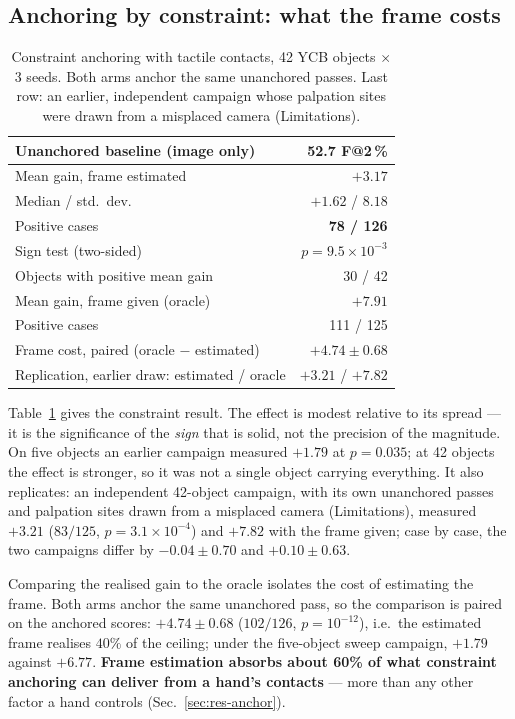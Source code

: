 \documentclass[conference]{IEEEtran}
\makeatletter
\newcommand{\gd}[1]{\textbf{#1}}
\newcommand{\Fs}{F@2\,\%}
\makeatother
\begin{document}
\subsection{Anchoring by constraint: what the frame costs}
\label{sec:res-constraint}

\begin{table}[t]
\centering
\caption{Constraint anchoring with tactile contacts, 42 YCB objects $\times$ 3 seeds.
Both arms anchor the same unanchored passes. Last row: an earlier, independent
campaign whose palpation sites were drawn from a misplaced camera (Limitations).}
\label{tab:main}
\begin{tabular}{lr}
\toprule
Unanchored baseline (image only) & 52.7 \Fs \\
\midrule
Mean gain, frame estimated & \gd{$+3.17$} \\
Median / std.\ dev. & $+1.62$ / $8.18$ \\
Positive cases & \gd{78 / 126} \\
Sign test (two-sided) & \gd{$p = 9.5\times10^{-3}$} \\
Objects with positive mean gain & 30 / 42 \\
\midrule
Mean gain, frame given (oracle) & $+7.91$ \\
Positive cases & 111 / 125 \\
Frame cost, paired (oracle $-$ estimated) & $+4.74 \pm 0.68$ \\
\midrule
Replication, earlier draw: estimated / oracle & $+3.21$ / $+7.82$ \\
\bottomrule
\end{tabular}
\end{table}

Table~\ref{tab:main} gives the constraint result. The effect is modest relative to its
spread --- it is the significance of the \emph{sign} that is solid, not the precision
of the magnitude. On five objects an earlier campaign measured $+1.79$ at $p = 0.035$;
at 42 objects the effect is stronger, so it was not a single object carrying
everything. It also replicates: an independent 42-object campaign, with its own
unanchored passes and palpation sites drawn from a misplaced camera (Limitations),
measured $+3.21$ ($83/125$, $p = 3.1\times10^{-4}$) and $+7.82$ with the frame given;
case by case, the two campaigns differ by $-0.04 \pm 0.70$ and $+0.10 \pm 0.63$.

Comparing the realised gain to the oracle isolates the cost of estimating the frame.
Both arms anchor the same unanchored pass, so the comparison is paired on the anchored
scores: $+4.74 \pm 0.68$ ($102/126$, $p = 10^{-12}$), i.e.\ the estimated frame realises
$40\%$ of the ceiling; under the five-object sweep campaign, $+1.79$ against $+6.77$.
\textbf{Frame estimation absorbs about 60\% of what constraint anchoring can deliver
from a hand's contacts} --- more than any other factor a hand controls
(Sec.~\ref{sec:res-anchor}).
\end{document}
